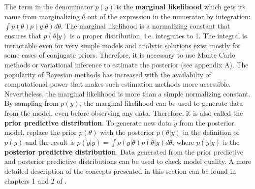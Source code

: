 The term in the denominator $p(y)$ is the \textbf{marginal likelihood} which gets its name from marginalizing $\theta$ out of the expression in the numerator by integration: $\int p(\theta) p(y|\theta)d\theta$.
The marginal likelihood is a normalizing constant that ensures that $p(\theta|y)$ is a proper distribution, i.e. integrates to 1.
The integral is intractable even for very simple models and analytic solutions exist mostly for some cases of conjugate priors.
Therefore, it is necessary to use Monte Carlo methods or variational inference to estimate the posterior (see appendix A). The popularity of Bayesian methods has increased with the availabilty of computational power that makes such estimation methods more accessible.
Nevertheless, the marginal likelihood is more than a simple normalizing constant.
By sampling from $p(y)$, the marginal likelihood can be used to generate data from the model, even before observing any data.
Therefore, it is also called the \textbf{prior predictive distribution}.
To generate new data  $\tilde y$ from the posterior model, replace the prior $p(\theta)$ with the posterior $p(\theta|y)$ in the definition of $p(y)$ and the result is $p(\tilde y|y) = \int p(y | \theta) p(\theta|y) d\theta$, where $p(\tilde y | y)$ is the \textbf{posterior predictive distribution}.
Data generated from the prior predictive and posterior predictive distributions can be used to check model quality.
A more detailed description of the concepts presented in this section can be found in chapters 1 and 2 of \cite{gelman_bayesian_2014}.

